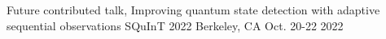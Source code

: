 
\begin{cventries}

  \cventry
    {Future contributed talk, Improving quantum state detection with adaptive sequential observations} %
    {SQuInT 2022} %
    {Berkeley, CA} %
    {Oct. 20-22 2022} %
    {}

\end{cventries}

